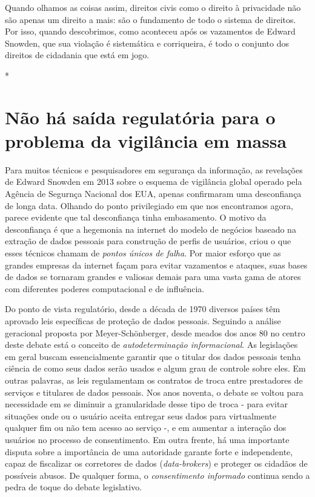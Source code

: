 Quando olhamos as coisas assim, direitos civis como o direito à
privacidade não são apenas um direito a mais: são o fundamento de todo o
sistema de direitos. Por isso, quando descobrimos, como aconteceu após
os vazamentos de Edward Snowden, que sua violação é sistemática e
corriqueira, é todo o conjunto dos direitos de cidadania que está em
jogo.

*

\section{Não há saída regulatória para o problema da vigilância em massa}

Para muitos técnicos e pesquisadores em segurança da informação, as
revelações de Edward Snowden em 2013 sobre o esquema de vigilância
global operado pela Agência de Segurnça Nacional dos EUA, apenas
confirmaram uma desconfiança de longa data. Olhando do ponto
privilegiado em que nos encontramos agora, parece evidente que tal
desconfiança tinha embasamento. O motivo da desconfiança é que a
hegemonia na internet do modelo de negócios baseado na extração de dados
pessoais para construção de perfis de usuários, criou o que esses
técnicos chamam de \emph{pontos únicos de falha}. Por maior esforço que
as grandes empresas da internet façam para evitar vazamentos e ataques,
suas bases de dados se tornaram grandes e valiosas demais para uma vasta
gama de atores com diferentes poderes computacional e de influência.

Do ponto de vista regulatório, desde a década de 1970 diversos países
têm aprovado leis específicas de proteção de dados pessoais. Seguindo a
análise geracional proposta por Meyer-Schönberger, desde meados dos anos
80 no centro deste debate está o conceito de \emph{autodeterminação
informacional}. As legislações em geral buscam essencialmente garantir
que o titular dos dados pessoais tenha ciência de como seus dados serão
usados e algum grau de controle sobre eles. Em outras palavras, as leis
regulamentam os contratos de troca entre prestadores de serviços e
titulares de dados pessoais. Nos anos noventa, o debate se voltou para
necessidade em se diminuir a granularidade desse tipo de troca - para
evitar situações onde ou o usuário aceita entregar seus dados para
virtualmente qualquer fim ou não tem acesso ao serviço -, e em aumentar
a interação dos usuários no processo de consentimento. Em outra frente,
há uma importante disputa sobre a importância de uma autoridade garante
forte e independente, capaz de fiscalizar os corretores de dados
(\emph{data-brokers}) e proteger os cidadãos de possíveis abusos. De
qualquer forma, o \emph{consentimento informado} continua sendo a pedra
de toque do debate legislativo.

